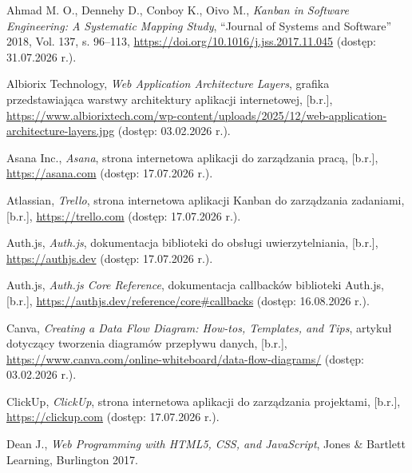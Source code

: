 \documentclass[12pt,a4paper]{article}
\begin{document}
\begingroup
\sloppy
\begin{list}{}{\setlength{\leftmargin}{0pt}\setlength{\itemindent}{0pt}\setlength{\labelwidth}{0pt}\setlength{\labelsep}{0pt}\setlength{\itemsep}{0.5\baselineskip}}

\item Ahmad M. O., Dennehy D., Conboy K., Oivo M., \emph{Kanban in Software Engineering: A Systematic Mapping Study}, ``Journal of Systems and Software'' 2018, Vol. 137, s. 96--113, \url{https://doi.org/10.1016/j.jss.2017.11.045} (dostęp: 31.07.2026 r.).

\item Albiorix Technology, \emph{Web Application Architecture Layers}, grafika przedstawiająca warstwy architektury aplikacji internetowej, [b.r.], \url{https://www.albiorixtech.com/wp-content/uploads/2025/12/web-application-architecture-layers.jpg} (dostęp: 03.02.2026 r.).

\item Asana Inc., \emph{Asana}, strona internetowa aplikacji do zarządzania pracą, [b.r.], \url{https://asana.com} (dostęp: 17.07.2026 r.).

\item Atlassian, \emph{Trello}, strona internetowa aplikacji Kanban do zarządzania zadaniami, [b.r.], \url{https://trello.com} (dostęp: 17.07.2026 r.).

\item Auth.js, \emph{Auth.js}, dokumentacja biblioteki do obsługi uwierzytelniania, [b.r.], \url{https://authjs.dev} (dostęp: 17.07.2026 r.).

\item Auth.js, \emph{Auth.js Core Reference}, dokumentacja callbacków biblioteki Auth.js, [b.r.], \url{https://authjs.dev/reference/core\#callbacks} (dostęp: 16.08.2026 r.).

\item Canva, \emph{Creating a Data Flow Diagram: How-tos, Templates, and Tips}, artykuł dotyczący tworzenia diagramów przepływu danych, [b.r.], \url{https://www.canva.com/online-whiteboard/data-flow-diagrams/} (dostęp: 03.02.2026 r.).

\item ClickUp, \emph{ClickUp}, strona internetowa aplikacji do zarządzania projektami, [b.r.], \url{https://clickup.com} (dostęp: 17.07.2026 r.).

\item Dean J., \emph{Web Programming with HTML5, CSS, and JavaScript}, Jones \& Bartlett Learning, Burlington 2017.


\end{list}
\end{document}
